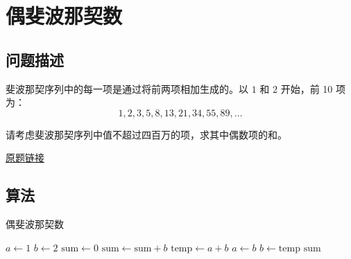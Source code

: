 \section{偶斐波那契数}
\subsection{问题描述}
\begin{tcolorbox}
	斐波那契序列中的每一项是通过将前两项相加生成的。以 $1$ 和 $2$ 开始，前 10 项为：
	$$1, 2, 3, 5, 8, 13, 21, 34, 55, 89, \dots$$

	请考虑斐波那契序列中值不超过四百万的项，求其中偶数项的和。

	\href{https://projecteuler.net/problem=2}{原题链接}
\end{tcolorbox}

\subsection{算法}
\begin{algorithm}
	\caption{偶斐波那契数}
	\begin{algorithmic}[1]
		\State \( a \gets 1 \)
		\State \(b \gets 2 \)
		\State \(\mathrm{sum} \gets 0 \)
		\State \( \mathrm{sum} \gets \mathrm{sum} + b \)
		\EndIf
		\State \( \mathrm{temp} \gets a + b \)
		\State \( a \gets b \)
		\State \( b \gets \mathrm{temp} \)
		\EndWhile
		\Return \( \mathrm{sum} \)
	\end{algorithmic}
\end{algorithm}
